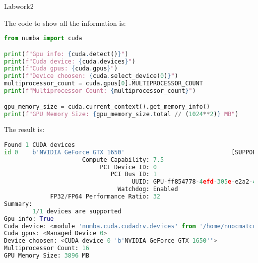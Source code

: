 \documentclass[12pt]{article}
\begin{document}
\begin{center}
    \vspace*{1.8cm}
    \Large
    Labwork2\\
\end{center}

\noindent
The code to show all the information is:

\noindent
\begin{lstlisting}[language=Python]
from numba import cuda

print(f"Gpu info: {cuda.detect()}")
print(f"Cuda device: {cuda.devices}")
print(f"Cuda gpus: {cuda.gpus}")
print(f"Device choosen: {cuda.select_device(0)}")
multiprocessor_count = cuda.gpus[0].MULTIPROCESSOR_COUNT
print(f"Multiprocessor Count: {multiprocessor_count}")

gpu_memory_size = cuda.current_context().get_memory_info()
print(f"GPU Memory Size: {gpu_memory_size.total // (1024**2)} MB")
\end{lstlisting}

\noindent
The result is: 

\noindent
\begin{lstlisting}[language=Python]
Found 1 CUDA devices
id 0    b'NVIDIA GeForce GTX 1650'                              [SUPPORTED]
                      Compute Capability: 7.5
                           PCI Device ID: 0
                              PCI Bus ID: 1
                                    UUID: GPU-ff854778-4efd-305e-e2a2-4e0844c56b1a
                                Watchdog: Enabled
             FP32/FP64 Performance Ratio: 32
Summary:
        1/1 devices are supported
Gpu info: True
Cuda device: <module 'numba.cuda.cudadrv.devices' from '/home/nuocmatcuamua/anaconda3/envs/allenv/lib/python3.8/site-packages/numba/cuda/cudadrv/devices.py'>
Cuda gpus: <Managed Device 0>
Device choosen: <CUDA device 0 'b'NVIDIA GeForce GTX 1650''>
Multiprocessor Count: 16
GPU Memory Size: 3896 MB
\end{lstlisting}
\end{document}
